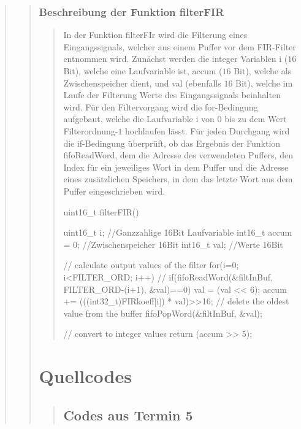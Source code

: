 \begin{quote}
\begin{quote}
    	\subsubsection{Beschreibung der Funktion filterFIR}
    	\begin{quote}
    	In der Funktion filterFIr wird die Filterung eines Eingangssignals, welcher
    	aus einem Puffer vor dem FIR-Filter entnommen wird. 
    	Zunächst werden die integer Variablen i ($16$ Bit), welche eine
    	Laufvariable ist, accum ($16$ Bit), welche als Zwischenspeicher dient, und
    	val (ebenfalls $16$ Bit), welche im Laufe der Filterung Werte des
    	Eingangssignals beinhalten wird. Für den Filtervorgang wird die
 		for-Bedingung aufgebaut, welche die Laufvariable i von $0$ bis zu dem Wert
 		Filterordnung-$1$ hochlaufen lässt. Für jeden Durchgang wird die if-Bedingung
 		überprüft, ob das Ergebnis der Funktion fifoReadWord, dem die Adresse des
 		verwendeten Puffers, den Index für ein jeweiliges Wort in dem Puffer und die
 		Adresse eines zusätzlichen Speichers, in dem das letzte Wort aus dem Puffer eingeschrieben wird.
		
    	
    	
    	uint16_t filterFIR() {
	uint16_t i; //Ganzzahlige 16Bit Laufvariable
	int16_t accum = 0; //Zwischenspeicher 16Bit 
	int16_t val; //Werte 16Bit

	// calculate output values of the filter
	for(i=0; i<FILTER_ORD; i++) { //
		if(fifoReadWord(&filtInBuf, FILTER_ORD-(i+1), &val)==0) {
			val = (val << 6);
			accum += (((int32_t)FIRkoeff[i]) * val)>>16;
		}
	}
	// delete the oldest value from the buffer
	fifoPopWord(&filtInBuf, &val);

	// convert to integer values
	return (accum >> 5);	
}
    	
		
\end{quote}

\section{Quellcodes}
\begin{quote}

	\subsection{Codes aus Termin 5}
	\begin{quote}

\end{quote}
\end{quote}
\end{quote}
\end{quote}

